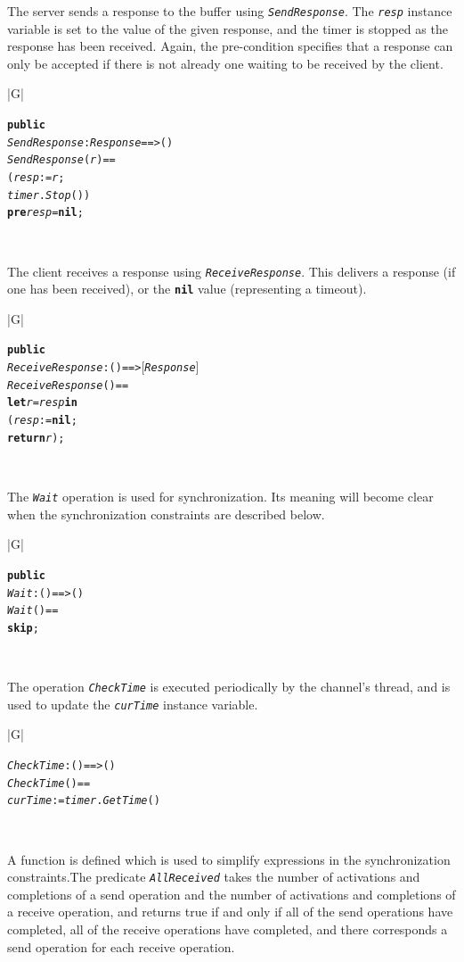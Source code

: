 \documentclass[\pformat,12pt,twoside]{article}
\newenvironment{VDMgray}%
{\begin{tabular}{|G|}\hline\small\begin{alltt}}%
{\end{alltt}\normalsize\\
 \hline\end{tabular}}
\begin{document}
The server sends a response to the buffer using \texttt{\emph{SendResponse}}. 
The \texttt{\emph{resp}} instance variable is set to the value of the given response, 
and the timer is stopped as the response has been received. Again, 
the pre-condition specifies that a response can only be accepted 
if there is not already one waiting to be received by the client.

\begin{VDMgray}
 \textbf{public}
 \textit{SendResponse} : \textit{Response} ==\texttt{>} ()
 \textit{SendResponse}(\textit{r}) ==
   (\textit{resp} := \textit{r};
    \textit{timer}.\textit{Stop}())
 \textbf{pre} \textit{resp} = \textbf{nil};
\end{VDMgray}


The client receives a response using \texttt{\emph{ReceiveResponse}}. This delivers 
a response (if one has been received), or the \texttt{\textbf{nil}} value (representing 
a timeout). 

\begin{VDMgray}
 \textbf{public}
 \textit{ReceiveResponse} : () ==\texttt{>} \ensuremath{[}\textit{Response}\ensuremath{]}
 \textit{ReceiveResponse}() ==
   \textbf{let} \textit{r} = \textit{resp} \textbf{in}
     (\textit{resp} := \textbf{nil};
      \textbf{return} \textit{r});
\end{VDMgray}


The \texttt{\emph{Wait}} operation is used for synchronization. Its meaning will 
become clear when the synchronization constraints are described 
below.

\begin{VDMgray}
 \textbf{public}
 \textit{Wait}: () ==\texttt{>} ()
 \textit{Wait}() ==
   \textbf{skip};
\end{VDMgray}


The operation \texttt{\emph{CheckTime}} is executed periodically by the channel's 
thread, and is used to update the \texttt{\emph{curTime}} instance variable.

\begin{VDMgray}
 \textit{CheckTime}: () ==\texttt{>} ()
 \textit{CheckTime}() ==
   \textit{curTime} := \textit{timer}.\textit{GetTime}()
\end{VDMgray}


A function is defined which is used to simplify expressions in 
the synchronization constraints.The predicate \texttt{\emph{AllReceived}} takes 
the number of activations and completions of a send operation 
and the number of activations and completions of a receive operation, 
and returns true if and only if all of the send operations have 
completed, all of the receive operations have completed, and 
there corresponds a send operation for each receive operation.
\end{document}
